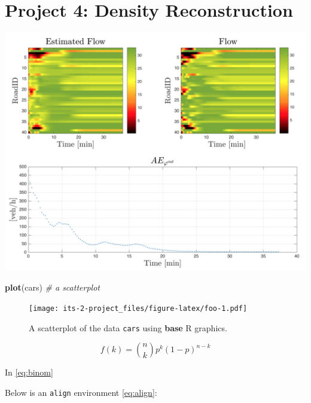 \documentclass[]{book}
\newenvironment{Shaded}{\begin{snugshade}}{\end{snugshade}}
\newcommand{\CommentTok}[1]{\textcolor[rgb]{0.56,0.35,0.01}{\textit{#1}}}
\newcommand{\KeywordTok}[1]{\textcolor[rgb]{0.13,0.29,0.53}{\textbf{#1}}}
\newcommand{\NormalTok}[1]{#1}
\theoremstyle{definition}
\theoremstyle{definition}
\theoremstyle{definition}
\theoremstyle{remark}
\begin{document}
\hypertarget{project-4-density-reconstruction}{%
\chapter{Project 4: Density
Reconstruction}\label{project-4-density-reconstruction}}

\includegraphics{images/p4-01-density.png}




\begin{Shaded}
\begin{Highlighting}[]
\KeywordTok{plot}\NormalTok{(cars)  }\CommentTok{# a scatterplot}
\end{Highlighting}
\end{Shaded}

\begin{figure}
\centering
\texttt{[image: its-2-project\_files/figure-latex/foo-1.pdf]}
\caption{\label{fig:foo}A scatterplot of the data \texttt{cars} using \textbf{base} R
graphics.}
\end{figure}

\begin{equation}
f\left(k\right)=\binom{n}{k}p^k\left(1-p\right)^{n-k} \label{eq:binom}
\end{equation}

In \eqref{eq:binom}

Below is an \texttt{align} environment \eqref{eq:align}:
\end{document}
